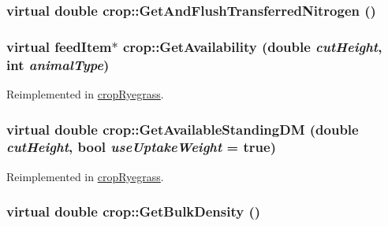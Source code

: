\label{classcrop_a1eb45dfdaae692240eac0102df381742}
\hypertarget{classcrop_a646a4f85f4fd25b4cbfc37cb46aae4ab}{
\subsubsection[{GetAndFlushTransferredNitrogen}]{\setlength{\rightskip}{0pt plus 5cm}virtual double crop::GetAndFlushTransferredNitrogen ()}}
\label{classcrop_a646a4f85f4fd25b4cbfc37cb46aae4ab}
\hypertarget{classcrop_a066047061cd93c3ae3e798d66dc002fb}{
\subsubsection[{GetAvailability}]{\setlength{\rightskip}{0pt plus 5cm}virtual {\bf feedItem}$\ast$ crop::GetAvailability (double {\em cutHeight}, \/  int {\em animalType})}}
\label{classcrop_a066047061cd93c3ae3e798d66dc002fb}


Reimplemented in \hyperlink{classcrop_ryegrass_a3907b56b9f463da7667d89f726543ef5}{cropRyegrass}.\hypertarget{classcrop_ac48847f64021da9cd0c2dac80d6b7849}{
\subsubsection[{GetAvailableStandingDM}]{\setlength{\rightskip}{0pt plus 5cm}virtual double crop::GetAvailableStandingDM (double {\em cutHeight}, \/  bool {\em useUptakeWeight} = {\ttfamily true})}}
\label{classcrop_ac48847f64021da9cd0c2dac80d6b7849}


Reimplemented in \hyperlink{classcrop_ryegrass_a4bf3812ba96c183f5ff8b671d8ee9d85}{cropRyegrass}.\hypertarget{classcrop_a9346991c7b35dd7767dec41314a26274}{
\subsubsection[{GetBulkDensity}]{\setlength{\rightskip}{0pt plus 5cm}virtual double crop::GetBulkDensity ()}}
\label{classcrop_a9346991c7b35dd7767dec41314a26274}


